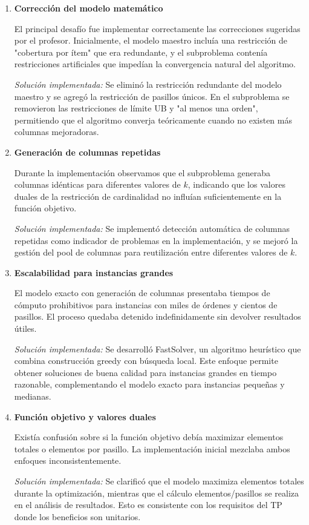 \documentclass[a4paper,12pt]{article}
\begin{document}
\begin{enumerate}

    \item \textbf{Corrección del modelo matemático}
    
    El principal desafío fue implementar correctamente las correcciones sugeridas por el profesor. Inicialmente, el modelo maestro incluía una restricción de "cobertura por ítem" que era redundante, y el subproblema contenía restricciones artificiales que impedían la convergencia natural del algoritmo.
    
    \emph{Solución implementada:} Se eliminó la restricción redundante del modelo maestro y se agregó la restricción de pasillos únicos. En el subproblema se removieron las restricciones de límite UB y "al menos una orden", permitiendo que el algoritmo converja teóricamente cuando no existen más columnas mejoradoras.

    \item \textbf{Generación de columnas repetidas}
    
    Durante la implementación observamos que el subproblema generaba columnas idénticas para diferentes valores de $k$, indicando que los valores duales de la restricción de cardinalidad no influían suficientemente en la función objetivo.
    
    \emph{Solución implementada:} Se implementó detección automática de columnas repetidas como indicador de problemas en la implementación, y se mejoró la gestión del pool de columnas para reutilización entre diferentes valores de $k$.

    \item \textbf{Escalabilidad para instancias grandes}
    
    El modelo exacto con generación de columnas presentaba tiempos de cómputo prohibitivos para instancias con miles de órdenes y cientos de pasillos. El proceso quedaba detenido indefinidamente sin devolver resultados útiles.
    
    \emph{Solución implementada:} Se desarrolló FastSolver, un algoritmo heurístico que combina construcción greedy con búsqueda local. Este enfoque permite obtener soluciones de buena calidad para instancias grandes en tiempo razonable, complementando el modelo exacto para instancias pequeñas y medianas.

    \item \textbf{Función objetivo y valores duales}
    
    Existía confusión sobre si la función objetivo debía maximizar elementos totales o elementos por pasillo. La implementación inicial mezclaba ambos enfoques inconsistentemente.
    
    \emph{Solución implementada:} Se clarificó que el modelo maximiza elementos totales durante la optimización, mientras que el cálculo elementos/pasillos se realiza en el análisis de resultados. Esto es consistente con los requisitos del TP donde los beneficios son unitarios.

\end{enumerate}
\end{document}
